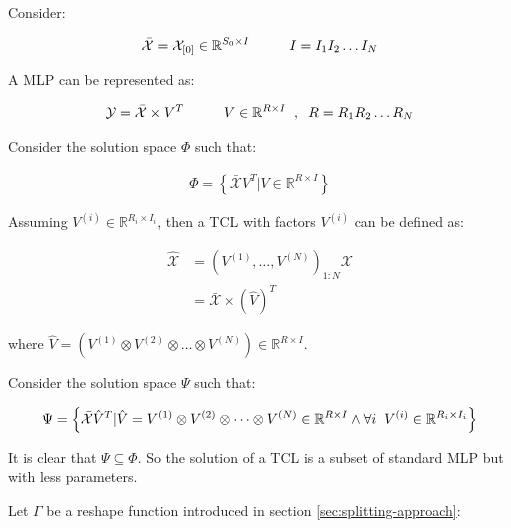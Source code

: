 \documentclass{article}
\begin{document}
Consider:

\begin{align}
	\label{eq:subspace-tcl-44}
	\bar{\mathcal{X}} = \mathcal{X}_{[0]} \in \mathbb{R}^{S_0\times I} \hspace{10mm}I=I_1I_2\dots I_N
\end{align}

A MLP can be represented as:

\begin{align}
	\label{eq:subspace-tcl-45}
	\mathcal{Y} = \bar{\mathcal{X}}\times V^T \hspace{10mm}V\in \mathbb{R}^{R\times I}\hspace{2mm},\hspace{2mm}R = R_1R_2\dots R_N 
\end{align}

Consider the solution space $\Phi$ such that:

\begin{align}
	\label{eq:subspace-tcl-46}
	\Phi = \left\{\bar{\mathcal{X}} V^T | V \in \mathbb{R}^{R\times I}\right\}
\end{align}


Assuming $V^{(i)} \in \mathbb{R}^{R_i\times I_i}$, then a TCL with factors $V^{(i)}$ can be defined as:

\begin{align}
	\label{eq:subspace-tcl-47}
	\hat{\mathcal{X}} &= \left(V^{(1)},\dots,V^{(N)}\right)_{1:N} \mathcal{X}
	\nonumber\\
	&= \bar{\mathcal{X}} \times (\hat{V})^T 
\end{align}

where $\hat{V} = \left(V^{(1)}\otimes V^{(2)}\otimes \dots\otimes V^{(N)} \right) \in \mathbb{R}^{R\times I}$.

Consider the solution space $\Psi$ such that:

\begin{align}
	\label{eq:subspace-tcl-48}
	\Psi = \left\{\bar{\mathcal{X}} \hat{V}^T | \hat{V} = V^{(1)}\otimes V^{(2)}\otimes \dots\otimes V^{(N)}  \in \mathbb{R}^{R\times I} \land \forall i \hspace{2mm} V^{(i)} \in \mathbb{R}^{R_i\times I_i}\right\}
\end{align}

It is clear that $\Psi \subseteq \Phi$. So the solution of a TCL is a subset of standard MLP but with less parameters. 

Let $\Gamma$ be a reshape function introduced in section \ref{sec:splitting-approach}:
\end{document}
